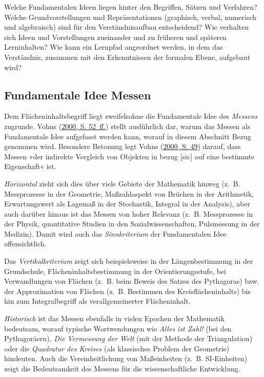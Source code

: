 \documentclass[
]{scrbook}
\renewenvironment{quote}{
  \list{}{
	\leftmargin0.2cm   %
    \rightmargin\leftmargin
      	\def\FrameCommand
    {%
        {\color{quoteColor}\vrule width 2pt}%
        \hspace{0pt}%
    }%
    \MakeFramed{\advance \hsize -\width \FrameRestore}    \color{quoteColor}
    }
  \item\relax
}
{\endlist\color{black}\endMakeFramed}
\theoremstyle{definition}
\theoremstyle{definition}
\theoremstyle{definition}
\theoremstyle{definition}
\theoremstyle{remark}
\begin{document}
\begin{quote}
Welche Fundamentalen Ideen liegen hinter den Begriffen, Sätzen und Verfahren?
Welche Grundvorstellungen und Repräsentationen (graphisch, verbal, numerisch und algebraisch) sind für den Verständnisaufbau entscheidend?
Wie verhalten sich Ideen und Vorstellungen zueinander und zu früheren und späteren Lerninhalten?
Wie kann ein Lernpfad angeordnet werden, in dem das Verständnis, zusammen mit den Erkenntnissen der formalen Ebene, aufgebaut wird?
\end{quote}

\hypertarget{fundamentale-idee-messen}{%
\subsection{Fundamentale Idee Messen}\label{fundamentale-idee-messen}}

Dem Flächeninhaltsbegriff liegt zweifelsohne die Fundamentale Idee des \emph{Messens} zugrunde. Vohns (\protect\hyperlink{ref-Vohns:2000}{2000, S. 52~ff.}) stellt ausführlich dar, warum das Messen als Fundamentale Idee aufgefasst werden kann, worauf in diesem Abschnitt Bezug genommen wird. Besondere Betonung legt Vohns (\protect\hyperlink{ref-Vohns:2000}{2000, S. 49}) darauf, dass Messen »der indirekte Vergleich von Objekten in bezug {[}sic{]} auf eine bestimmte Eigenschaft« ist.

\emph{Horizontal} zieht sich dies über viele Gebiete der Mathematik hinweg (z.~B. Messprozesse in der Geometrie, Maßzahlaspekt von Brüchen in der Arithmetik, Erwartungswert als Lagemaß in der Stochastik, Integral in der Analysis), aber auch darüber hinaus ist das Messen von hoher Relevanz (z.~B. Messprozesse in der Physik, quantitative Studien in den Sozialwissenschaften, Pulsmessung in der Medizin). Damit wird auch das \emph{Sinnkriterium} der Fundamentalen Idee offensichtlich.

Das \emph{Vertikalkriterium} zeigt sich beispielsweise in der Längenbestimmung in der Grundschule, Flächeninhaltsbestimmung in der Orientierungsstufe, bei Verwandlungen von Flächen (z.~B. beim Beweis des Satzes des Pythagoras) bzw. der Approximation von Flächen (z.~B. Bestimmen des Kreisflächeninhalts) bis hin zum Integralbegriff als verallgemeinerter Flächeninhalt.

\emph{Historisch} ist das Messen ebenfalls in vielen Epochen der Mathematik bedeutsam, worauf typische Wortwendungen wie \emph{Alles ist Zahl!} (bei den Pythagoräern), \emph{Die Vermessung der Welt} (mit der Methode der Triangulation) oder die \emph{Quadratur des Kreises} (als klassisches Problem der Geometrie) hindeuten. Auch die Vereinheitlichung von Maßeinheiten (z.~B. SI-Einheiten) zeigt die Bedeutsamkeit des Messens für die wissenschaftliche Entwicklung.
\end{document}

